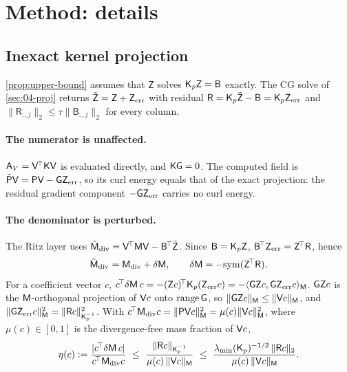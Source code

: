 \section{Method: details}\label{sec:A04-method}

\subsection{Inexact kernel projection}\label{sec:A04-inexact}

\cref{prop:upper-bound} assumes that $\mathsf Z$ solves $\Kp\mathsf Z=\mathsf B$ exactly.
The CG solve of \cref{sec:04-proj} returns $\tilde{\mathsf Z}=\mathsf Z+\mathsf Z_{\rm err}$ with residual $\mathsf R=\Kp\tilde{\mathsf Z}-\mathsf B=\Kp\mathsf Z_{\rm err}$ and $\|\mathsf R_{:,j}\|_2\le\tau\|\mathsf B_{:,j}\|_2$ for every column.

\paragraph{The numerator is unaffected.}
$\Av=\Vmat^{\!\top}\Kmat\Vmat$ is evaluated directly, and $\mathsf{K}\mathsf{G}=0$.
The computed field is $\tilde{\mathsf{P}}\mathsf{V}=\mathsf{P}\mathsf{V}-\mathsf{G}\mathsf Z_{\rm err}$, so its curl energy equals that of the exact projection: the residual gradient component $-\mathsf{G}\mathsf Z_{\rm err}$ carries no curl energy.

\paragraph{The denominator is perturbed.}
The Ritz layer uses $\tilde{\mathsf M}_{\rm div}=\mathsf{V}^{\!\top}\mathsf{M}\mathsf{V}-\mathsf B^{\!\top}\tilde{\mathsf Z}$.
Since $\mathsf B=\Kp\mathsf Z$, $\mathsf B^{\!\top}\mathsf Z_{\rm err}=\mathsf Z^{\!\top}\mathsf R$, hence
\[
  \tilde{\mathsf M}_{\rm div}=\Mdiv+\delta\mathsf M,\qquad \delta\mathsf M=-\mathrm{sym}(\mathsf Z^{\!\top}\mathsf R).
\]
For a coefficient vector $c$, $c^{\!\top}\delta\mathsf M\,c=-(\mathsf Zc)^{\!\top}\Kp(\mathsf Z_{\rm err}c)=-\langle\Gmat\mathsf Zc,\Gmat\mathsf Z_{\rm err}c\rangle_{\Mmat}$.
$\mathsf{G}\mathsf Zc$ is the $\mathsf{M}$-orthogonal projection of $\mathsf{V} c$ onto $\mathrm{range}\,\mathsf{G}$, so $\|\mathsf{G}\mathsf Zc\|_{\mathsf{M}}\le\|\mathsf{V} c\|_{\mathsf{M}}$, and $\|\Gmat\mathsf Z_{\rm err}c\|_{\Mmat}^2=\|\mathsf Rc\|_{\Kp^{-1}}^2$.
With $c^{\!\top}\Mdiv c=\|\Pmat\Vmat c\|_{\Mmat}^2=\mu(c)\|\Vmat c\|_{\Mmat}^2$, where $\mu(c)\in[0,1]$ is the divergence-free mass fraction of $\mathsf{V} c$,
\[
  \eta(c):=\frac{|c^{\!\top}\delta\mathsf M\,c|}{c^{\!\top}\Mdiv c}\ \le\ \frac{\|\mathsf Rc\|_{\Kp^{-1}}}{\mu(c)\,\|\Vmat c\|_{\Mmat}}\ \le\ \frac{\lambda_{\min}(\Kp)^{-1/2}\,\|\mathsf Rc\|_2}{\mu(c)\,\|\Vmat c\|_{\Mmat}}.
\]

